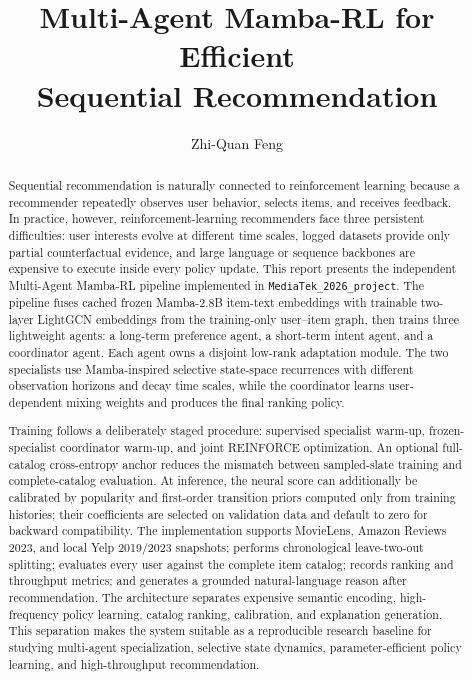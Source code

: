 \documentclass[11pt,a4paper]{article}
\title{\textbf{Multi-Agent Mamba-RL for Efficient\\Sequential Recommendation}}
\author{Zhi-Quan Feng}
\date{}
\newcommand{\Project}{\texttt{MediaTek\_2026\_project}}
\begin{document}
\maketitle

\begin{abstract}
Sequential recommendation is naturally connected to reinforcement learning because a recommender repeatedly observes user behavior, selects items, and receives feedback. In practice, however, reinforcement-learning recommenders face three persistent difficulties: user interests evolve at different time scales, logged datasets provide only partial counterfactual evidence, and large language or sequence backbones are expensive to execute inside every policy update. This report presents the independent Multi-Agent Mamba-RL pipeline implemented in \Project. The pipeline fuses cached frozen Mamba-2.8B item-text embeddings with trainable two-layer LightGCN embeddings from the training-only user--item graph, then trains three lightweight agents: a long-term preference agent, a short-term intent agent, and a coordinator agent. Each agent owns a disjoint low-rank adaptation module. The two specialists use Mamba-inspired selective state-space recurrences with different observation horizons and decay time scales, while the coordinator learns user-dependent mixing weights and produces the final ranking policy.

Training follows a deliberately staged procedure: supervised specialist warm-up, frozen-specialist coordinator warm-up, and joint REINFORCE optimization. An optional full-catalog cross-entropy anchor reduces the mismatch between sampled-slate training and complete-catalog evaluation. At inference, the neural score can additionally be calibrated by popularity and first-order transition priors computed only from training histories; their coefficients are selected on validation data and default to zero for backward compatibility. The implementation supports MovieLens, Amazon Reviews 2023, and local Yelp 2019/2023 snapshots; performs chronological leave-two-out splitting; evaluates every user against the complete item catalog; records ranking and throughput metrics; and generates a grounded natural-language reason after recommendation. The architecture separates expensive semantic encoding, high-frequency policy learning, catalog ranking, calibration, and explanation generation. This separation makes the system suitable as a reproducible research baseline for studying multi-agent specialization, selective state dynamics, parameter-efficient policy learning, and high-throughput recommendation.
\end{abstract}
\end{document}
